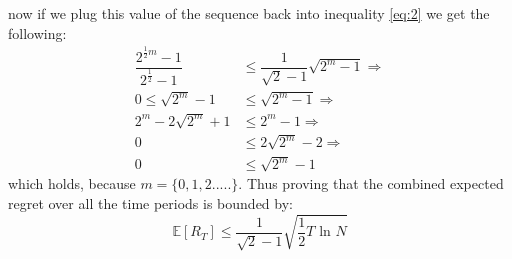 \documentclass{article}
\begin{document}
now if we plug this value of the sequence back into inequality \eqref{eq:2} we get the following:
\begin{align}
\dfrac{2^{\frac{1}{2}m}-1}{2^{\frac{1}{2}}-1} &\leq \dfrac{1}{\sqrt{2}-1}\sqrt{ 2^m-1 } \Rightarrow \\
0 \leq \sqrt{2^m}-1 &\leq \sqrt{2^m-1} \Rightarrow \\
2^m - 2 \sqrt{2^m} + 1 &\leq 2^m -1 \Rightarrow \\
0 &\leq 2 \sqrt{2^m} -2 \Rightarrow \\
0 &\leq \sqrt{2^m} -1
\end{align}
which holds, because $m = \lbrace 0,1,2..... \rbrace$. Thus proving that the combined expected regret over all the time periods is bounded by:
\begin{equation}
\mathbb{E}[R_T] \leq \dfrac{1}{\sqrt{2}-1}\sqrt{\dfrac{1}{2} T \text{ ln } N}
\end{equation}
\end{document}
